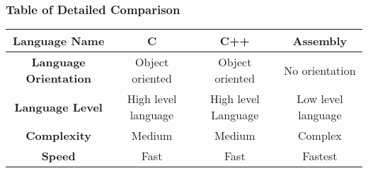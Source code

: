 \subsubsection{Table of Detailed Comparison}
\hfill \break
\begin{center}
\begin{tabular}{|c|c|c|c|}
\hline
\textbf{Language Name}                                  & \textbf{C}                                                                                                                            & \textbf{C++}                                                                                                    & \textbf{Assembly}                                                                                                                                                     \\ \hline
\textbf{Language Orientation}                           & Object oriented                                                                                                                       & Object oriented                                                                                                 & No orientation                                                                                                                                                        \\ \hline
\textbf{Language Level}                                 & High level language                                                                                                                   & High level Language                                                                                             & Low level language                                                                                                                                                    \\ \hline
\textbf{Complexity}                                     & Medium                                                                                                                                & Medium                                                                                                          & Complex                                                                                                                                                               \\ \hline
\textbf{Speed}                                          & Fast                                                                                                                                  & Fast                                                                                                            & Fastest                                                                                                                                                               \\ \hline

\end{tabular}
\end{center}
